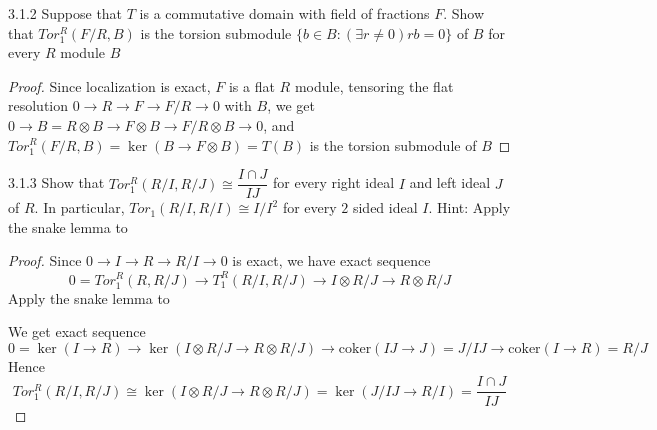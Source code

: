 \documentclass[../main.tex]{subfiles}
\begin{document}
\begin{customexercise}{3.1.2}
Suppose that $T$ is a commutative domain with field of fractions $F$. Show that $Tor_1^R(F/R,B)$ is the torsion submodule $\{b\in B:(\exists r\neq0)rb=0\}$ of $B$ for every $R$ module $B$
\end{customexercise}

\begin{proof}
Since localization is exact, $F$ is a flat $R$ module, tensoring the flat resolution $0\to R\to F\to F/R\to0$ with $B$, we get $0\to B=R\otimes B\to F\otimes B\to F/R\otimes B\to0$, and $Tor^R_1(F/R,B)=\ker(B\to F\otimes B)=T(B)$ is the torsion submodule of $B$
\end{proof}

\begin{customexercise}{3.1.3}
Show that $Tor_1^R(R/I,R/J)\cong\dfrac{I\cap J}{IJ}$ for every right ideal $I$ and left ideal $J$ of $R$. In particular, $Tor_1(R/I,R/I)\cong I/I^2$ for every $2$ sided ideal $I$. Hint: Apply the snake lemma to
\begin{center}
\end{center}
\end{customexercise}

\begin{proof}
Since $0\to I\to R\to R/I\to0$ is exact, we have exact sequence
\[0=Tor^R_1(R,R/J)\to T^R_1(R/I,R/J)\to I\otimes R/J\to R\otimes R/J\]
Apply the snake lemma to
\begin{center}
\end{center}
We get exact sequence
\[0=\ker(I\to R)\to\ker(I\otimes R/J\to R\otimes R/J)\to\mathrm{coker}(IJ\to J)=J/IJ\to\mathrm{coker}(I\to R)=R/J\]
Hence
\[Tor^R_1(R/I,R/J)\cong\ker(I\otimes R/J\to R\otimes R/J)=\ker(J/IJ\to R/I)=\dfrac{I\cap J}{IJ}\]
\end{proof}
\end{document}
